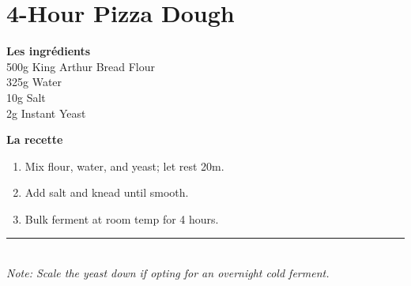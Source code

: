 \documentclass[4x6]{recipe-card}
\begin{document}
\section*{\color{recipeRed} 4-Hour Pizza Dough}

\begin{minipage}[t]{0.35\textwidth}
    \textbf{Les ingrédients} \\
    \small
    500g King Arthur Bread Flour \\
    325g Water \\
    10g Salt \\
    2g Instant Yeast
\end{minipage}
\begin{minipage}[t]{0.6\textwidth}
    \textbf{La recette} \\
    \small
    \begin{enumerate}
        \item Mix flour, water, and yeast; let rest 20m.
        \item Add salt and knead until smooth.
        \item Bulk ferment at room temp for 4 hours.
    \end{enumerate}
\end{minipage}

\vfill
\begin{flushleft}
    \rule{0.5\textwidth}{0.4pt} \\
    \textit{\small Note: Scale the yeast down if opting for an overnight cold ferment.}
\end{flushleft}

\end{document}
